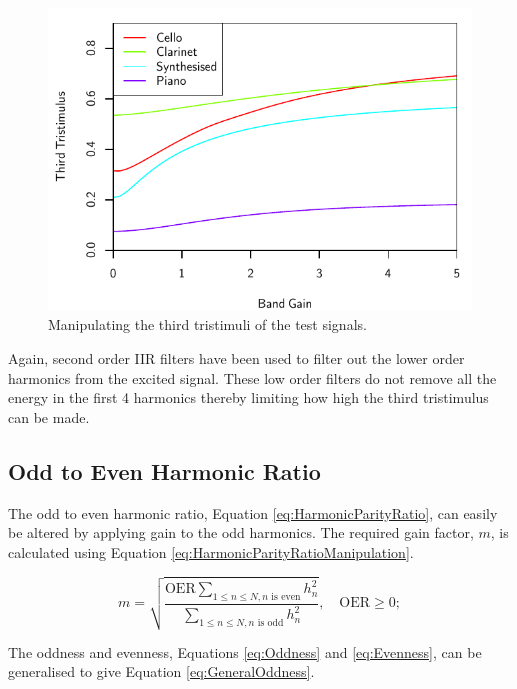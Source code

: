 		\begin{figure}[h!]
			\centering
			\includegraphics{chapter6/Images/MoveTristimulus3.pdf}
			\caption{Manipulating the third tristimuli of the test signals.}
			\label{fig:MoveTristimulus3}
		\end{figure}

		Again, second order IIR filters have been used to filter out the lower order harmonics from the excited
		signal.	These low order filters do not remove all the energy in the first 4 harmonics thereby limiting how
		high the third tristimulus can be made.

	\subsection{Odd to Even Harmonic Ratio}
	\label{sec:FeatureControl-Parameterisation-HarmonicParityRatio}
		The odd to even harmonic ratio, Equation \ref{eq:HarmonicParityRatio}, can easily be altered by applying
		gain to the odd harmonics. The required gain factor, $m$, is calculated using Equation
		\ref{eq:HarmonicParityRatioManipulation}.

		\begin{equation}
			m = \sqrt{\frac{\mathrm{OER}\sum_{1 \leq n \leq N, n \text{ is even}} h_{n}^{2}}
				       {\sum_{1 \leq n \leq N, n \text{ is odd}} h_{n}^{2}}},
				       \quad \mathrm{OER} \geq 0;
		       \label{eq:HarmonicParityRatioManipulation}
		\end{equation}

		The oddness and evenness, Equations \ref{eq:Oddness} and \ref{eq:Evenness}, can be generalised to give
		Equation \ref{eq:GeneralOddness}.

